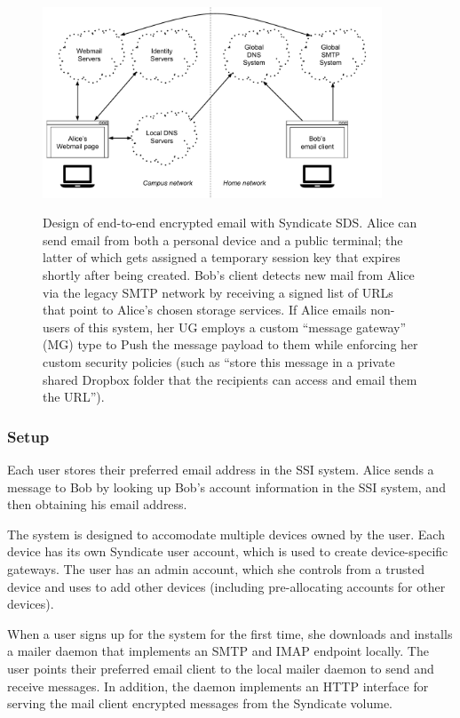 \begin{figure}[h]
   \caption{Design of end-to-end encrypted email with Syndicate SDS.  Alice can
   send email from both a personal device and a public terminal; the latter of
   which gets assigned a temporary session key that expires shortly after being
   created.  Bob's client detects new mail from Alice via the legacy SMTP
   network by receiving a signed list of URLs that point to Alice's chosen
   storage services.  If Alice emails non-users of this system, her UG employs a
   custom ``message gateway'' (MG) type to Push the message payload to them
   while enforcing her custom security policies (such as ``store this message in
   a private shared Dropbox folder that the recipients can access and email them
   the URL'').}
   \centering
   \includegraphics[width=0.9\textwidth,page=24]{figures/dissertation-figures}
   \label{fig:chap4-syndicate-mail}
\end{figure}

\subsubsection{Setup}

Each user stores their preferred email address in the SSI system.
Alice sends a message to Bob by looking up Bob's account
information in the SSI system, and then obtaining his email address.

The system is designed to accomodate multiple devices owned by the user.  Each
device has its own Syndicate user account, which is used to create
device-specific gateways.  The user has an admin account, which she controls
from a trusted device and uses to add other devices (including pre-allocating
accounts for other devices).

When a user signs up for the system for the first time, she downloads and
installs a mailer daemon
that implements an SMTP and IMAP endpoint locally.  The user points their preferred email
client to the local mailer daemon to send and receive messages.  In addition,
the daemon implements an HTTP interface for serving the mail client encrypted
messages from the Syndicate volume.

